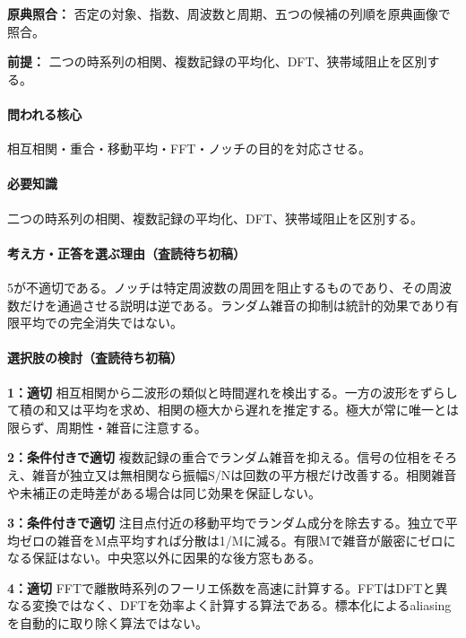 \noindent\textbf{原典照合：} 否定の対象、指数、周波数と周期、五つの候補の列順を原典画像で照合。\par

\noindent\textbf{前提：} 二つの時系列の相関、複数記録の平均化、DFT、狭帯域阻止を区別する。\par

\paragraph{問われる核心} 相互相関・重合・移動平均・FFT・ノッチの目的を対応させる。

\paragraph{必要知識} 二つの時系列の相関、複数記録の平均化、DFT、狭帯域阻止を区別する。

\paragraph{考え方・正答を選ぶ理由（査読待ち初稿）} 5が不適切である。ノッチは特定周波数の周囲を阻止するものであり、その周波数だけを通過させる説明は逆である。ランダム雑音の抑制は統計的効果であり有限平均での完全消失ではない。

\paragraph{選択肢の検討（査読待ち初稿）}\mbox{}\par

\noindent\textbf{1：適切} 相互相関から二波形の類似と時間遅れを検出する。一方の波形をずらして積の和又は平均を求め、相関の極大から遅れを推定する。極大が常に唯一とは限らず、周期性・雑音に注意する。\par

\noindent\textbf{2：条件付きで適切} 複数記録の重合でランダム雑音を抑える。信号の位相をそろえ、雑音が独立又は無相関なら振幅S/Nは回数の平方根だけ改善する。相関雑音や未補正の走時差がある場合は同じ効果を保証しない。\par

\noindent\textbf{3：条件付きで適切} 注目点付近の移動平均でランダム成分を除去する。独立で平均ゼロの雑音をM点平均すれば分散は1/Mに減る。有限Mで雑音が厳密にゼロになる保証はない。中央窓以外に因果的な後方窓もある。\par

\noindent\textbf{4：適切} FFTで離散時系列のフーリエ係数を高速に計算する。FFTはDFTと異なる変換ではなく、DFTを効率よく計算する算法である。標本化によるaliasingを自動的に取り除く算法ではない。\par

